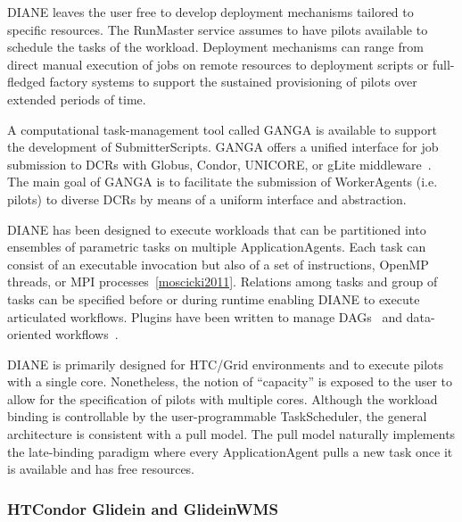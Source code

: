 \documentclass{sig-alternate}
\begin{document}
DIANE leaves the user free to develop deployment mechanisms tailored to specific
resources. The RunMaster service assumes to have pilots available to schedule
the tasks of the workload. Deployment mechanisms can range from direct manual
execution of jobs on remote resources to deployment scripts or full-fledged
factory systems to support the sustained provisioning of pilots over extended
periods of time.

A computational task-management tool called GANGA is available to support the
development of SubmitterScripts. GANGA offers a unified interface for job
submission to DCRs with Globus, Condor, UNICORE, or gLite
middleware~\cite{Moscicki20092303}. The main goal of GANGA is to facilitate the
submission of WorkerAgents (i.e. pilots) to diverse DCRs by means of a uniform
interface and abstraction.

DIANE has been designed to execute workloads that can be partitioned into
ensembles of parametric tasks on multiple ApplicationAgents. Each task can
consist of an executable invocation but also of a set of instructions, OpenMP
threads, or MPI processes~\ref{moscicki2011}. Relations among tasks and group of
tasks can be specified before or during runtime enabling DIANE to execute
articulated workflows. Plugins have been written to manage
DAGs~\cite{grzeslo2009} and data-oriented workflows~\cite{glatard2008}.

DIANE is primarily designed for HTC/Grid environments and to execute pilots with
a single core. Nonetheless, the notion of ``capacity'' is exposed to the user to
allow for the specification of pilots with multiple cores. Although the workload
binding is controllable by the user-programmable TaskScheduler, the general
architecture is consistent with a pull model. The pull model naturally
implements the late-binding paradigm where every ApplicationAgent pulls a new
task once it is available and has free resources.

%

%
\subsubsection{HTCondor Glidein and GlideinWMS}
\label{sec:glidein}

 
\end{document}
